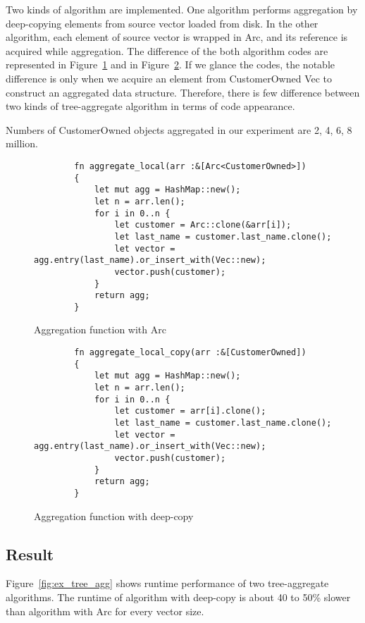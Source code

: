 Two kinds of algorithm are implemented. One algorithm performs aggregation by deep-copying elements from source vector loaded from disk. 
In the other algorithm, each element of source vector is wrapped in Arc, and its reference is acquired while aggregation. 
The difference of the both algorithm codes are represented in Figure~\ref{fig:arc_tree} and in Figure~\ref{fig:deep_tree}.
If we glance the codes, the notable difference is only when we acquire an element from CustomerOwned Vec to construct an aggregated data structure.
Therefore, there is few difference between two kinds of tree-aggregate algorithm in terms of code appearance.

Numbers of CustomerOwned objects aggregated in our experiment are 2, 4, 6, 8 million. 

\begin{figure}[htb]
    \begin{lstlisting}
        fn aggregate_local(arr :&[Arc<CustomerOwned>]) 
        {   
            let mut agg = HashMap::new();
            let n = arr.len();
            for i in 0..n {
                let customer = Arc::clone(&arr[i]);
                let last_name = customer.last_name.clone();
                let vector = agg.entry(last_name).or_insert_with(Vec::new);
                vector.push(customer);
            }
            return agg;
        }
    \end{lstlisting}
    \caption{Aggregation function with Arc}
    \label{fig:arc_tree}
\end{figure}


\begin{figure}[htb]
    \begin{lstlisting}
        fn aggregate_local_copy(arr :&[CustomerOwned]) 
        {   
            let mut agg = HashMap::new();
            let n = arr.len();
            for i in 0..n {
                let customer = arr[i].clone();
                let last_name = customer.last_name.clone();
                let vector = agg.entry(last_name).or_insert_with(Vec::new);
                vector.push(customer);
            }
            return agg;
        }
    \end{lstlisting}
    \caption{Aggregation function with deep-copy}
    \label{fig:deep_tree}
\end{figure}


\subsection{Result}
Figure~\ref{fig:ex_tree_agg} shows runtime performance of two tree-aggregate algorithms. 
The runtime of algorithm with deep-copy is about 40 to 50\% slower than algorithm with Arc for every vector size. 

